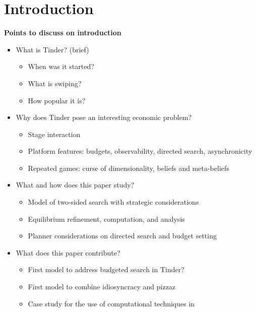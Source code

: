 \section{Introduction}
\label{sec:Introduction} 
\textbf{Points to discuss on introduction}
\begin{itemize}
    \item What is Tinder? (brief)
    \begin{itemize}
        \item When was it started?
        \item What is swiping?
        \item How popular it is?
    \end{itemize}
    \item Why does Tinder pose an interesting economic problem?
    \begin{itemize}
        \item Stage interaction
        \item Platform features: budgets, observability, directed search, asynchronicity
        \item Repeated games: curse of dimensionality, beliefs and meta-beliefs
    \end{itemize}
    \item What and how does this paper study?
    \begin{itemize}
        \item Model of two-sided search with strategic considerations
        \item Equilibrium refinement, computation, and analysis
        \item Planner considerations on directed search and budget setting
    \end{itemize}
    \item What does this paper contribute?
    \begin{itemize}
        \item First model to address budgeted search in Tinder?
        \item First model to combine idiosyncracy and pizzaz
        \item Case study for the use of computational techniques in 
    \end{itemize}
\end{itemize}
